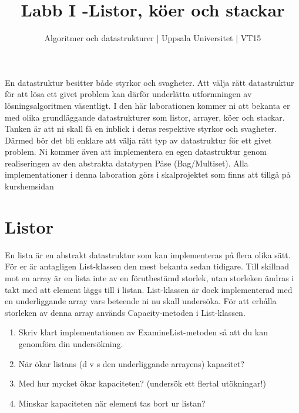 \documentclass{article}
\begin{document}
  \title{Labb I -Listor, köer och stackar }
  \author{ Algoritmer och datastrukturer | Uppsala Universitet | VT15 }
  \date{}
  \maketitle


  \section*{}
   En datastruktur besitter både styrkor och svagheter. Att välja rätt datastruktur för att
   lösa ett givet problem kan därför underlätta utformningen av lösningsalgoritmen väsentligt.
   I den här laborationen kommer ni att bekanta er med olika grundläggande datastrukturer
   som listor, arrayer, köer och stackar. Tanken är att ni skall få en inblick i deras respektive
   styrkor och svagheter. Därmed bör det bli enklare att välja rätt typ av datastruktur för ett
   givet problem. Ni kommer även att implementera en egen datastruktur genom realiseringen
   av den abstrakta datatypen Påse (Bag/Multiset). Alla implementationer i denna laboration
   görs i skalprojektet som finns att tillgå på kurshemsidan



  \section*{Listor
  }

  En lista är en abstrakt datastruktur som kan implementeras på flera olika sätt. För er är
  antagligen List-klassen den mest bekanta sedan tidigare. Till skillnad mot en array är en
  lista inte av en förutbestämd storlek, utan storleken ändras i takt med att element läggs
  till i listan. List-klassen är dock implementerad med en underliggande array vars beteende
  ni nu skall undersöka. För att erhålla storleken av denna array används Capacity-metoden i
  List-klassen.
  
  \begin{enumerate}
    \item Skriv klart implementationen av ExamineList-metoden så att du kan genomföra din
    undersökning.
    \item När ökar listans (d v s den underliggande arrayens) kapacitet?
    \item Med hur mycket ökar kapaciteten? (undersök ett flertal utökningar!)
    \item Minskar kapaciteten när element tas bort ur listan?
  \end{enumerate}
  
\end{document}

